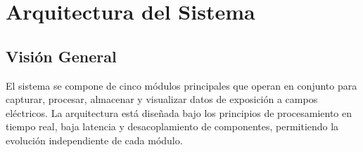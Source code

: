 \documentclass[12pt,a4paper]{article}
\begin{document}
\section{Arquitectura del Sistema}

\subsection{Visión General}

El sistema se compone de cinco módulos principales que operan en conjunto para capturar, procesar, almacenar y visualizar datos de exposición a campos eléctricos. La arquitectura está diseñada bajo los principios de procesamiento en tiempo real, baja latencia y desacoplamiento de componentes, permitiendo la evolución independiente de cada módulo.
\end{document}
